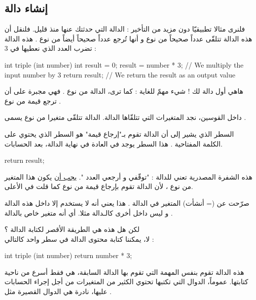 \subsection{إنشاء دالة}

فلنرى مثالا تطبيقيّا دون مزيد من التأخير : الدالة 
التي حدثتك عنها منذ قليل. فلنقل أن هذه الدالة تتلقّى عدداً صحيحاً من نوع 
و أنها تُرجع عدداً صحيحاً أيضاً من نوع 
.
هذه الدالة تضرب العدد الذي نعطيها في 3 :

\begin{Csource}
int triple (int number)
{
	int result = 0;
	result = number * 3; // We multiply the input number by 3
	return result; // We return the result as an output value
}
\end{Csource}

هاهي أول دالة لك ! شيء مهمّ للغاية : كما ترى، الدالة من نوع 
.
فهي مجبرة على  أن ترجع قيمة من نوع
.

داخل القوسين، نجد المتغيرات التي تتلقّاها الدالة. الدالة 
تتلقّى متغيرا من نوع 
يسمى 
.

السطر الذي يشير إلى أن الدالة تقوم بـ"إرجاع قيمة" هو السطر الذي يحتوي على الكلمة المفتاحية 
.
هذا السطر يوجد في العادة في نهاية الدالة، بعد الحسابات.

\begin{Csource}
return result;
\end{Csource}

هذه الشفرة المصدرية تعني للدالة : "توقّفي و أرجعي العدد 
".
\underline{يجب أن}
يكون هذا المتغير
من نوع
،
لأن الدالة تقوم بإرجاع قيمة من نوع
كما قلت في الأعلى.

صرّحت عن (= أنشأت) المتغير 
في الدالة 
.
هذا يعني أنه لا يستخدم إلا داخل هذه الدالة و ليس داخل أخرى كالـدالة
مثلا. أي أنه متغير خاص بالدالة 
.

لكن هل هذه هي الطريقة الأقصر لكتابة الدالة
 ؟\\
لا، يمكننا كتابة محتوى الدالة في سطر واحد كالتالي :

\begin{Csource}
int triple (int number)
{
	return number * 3;
}
\end{Csource}

هذه الدالة تقوم بنفس المهمة التي تقوم بها الدالة السابقة، هي فقط أسرع من ناحية كتابتها. عموماً، الدوال التي تكتبها تحتوي الكثير من المتغيرات من أجل إجراء الحسابات عليها، نادرة هي الدوال القصيرة مثل
.

